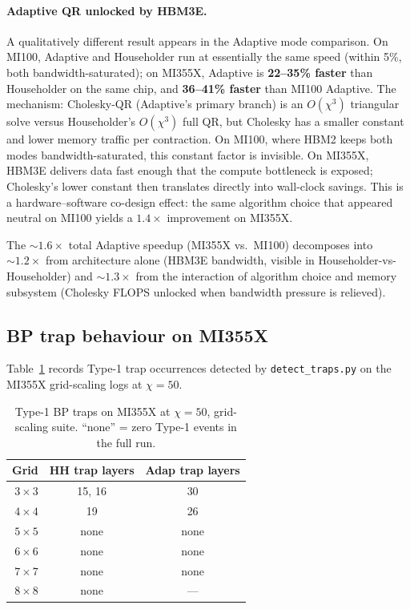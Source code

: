 \documentclass[11pt]{article}
\begin{document}
\paragraph{Adaptive QR unlocked by HBM3E.}
A qualitatively different result appears in the Adaptive mode comparison.
On MI100, Adaptive and Householder run at essentially the same speed (within 5\%,
both bandwidth-saturated); on MI355X, Adaptive is \textbf{22--35\% faster} than
Householder on the same chip, and \textbf{36--41\% faster} than MI100 Adaptive.
The mechanism: Cholesky-QR (Adaptive's primary branch) is an $O(\chi^3)$
triangular solve versus Householder's $O(\chi^3)$ full QR, but Cholesky has a
smaller constant and lower memory traffic per contraction.
On MI100, where HBM2 keeps both modes bandwidth-saturated, this constant factor
is invisible.
On MI355X, HBM3E delivers data fast enough that the compute bottleneck is exposed;
Cholesky's lower constant then translates directly into wall-clock savings.
This is a hardware--software co-design effect: the same algorithm choice that
appeared neutral on MI100 yields a $\mathbf{1.4\times}$ improvement on MI355X.

The $\sim 1.6\times$ total Adaptive speedup (MI355X vs.\ MI100) decomposes into
${\sim}1.2\times$ from architecture alone (HBM3E bandwidth, visible in
Householder-vs-Householder) and ${\sim}1.3\times$ from the interaction of
algorithm choice and memory subsystem (Cholesky FLOPS unlocked when bandwidth
pressure is relieved).

\subsection*{BP trap behaviour on MI355X}

Table~\ref{tab:traps_mi355x} records Type-1 trap occurrences detected by
\texttt{detect\_traps.py} on the MI355X grid-scaling logs at $\chi=50$.

\begin{table}[ht]
\centering
\caption{Type-1 BP traps on MI355X at $\chi=50$, grid-scaling suite.
  ``none'' = zero Type-1 events in the full run.}
\label{tab:traps_mi355x}
\smallskip
\small
\begin{tabular}{r cc}
\toprule
Grid    & HH trap layers & Adap trap layers \\
\midrule
$3\times3$ & 15, 16         & 30               \\
$4\times4$ & 19             & 26               \\
$5\times5$ & none           & none             \\
$6\times6$ & none           & none             \\
$7\times7$ & none           & none             \\
$8\times8$ & none           & ---              \\
\bottomrule
\end{tabular}
\end{table}
\end{document}
